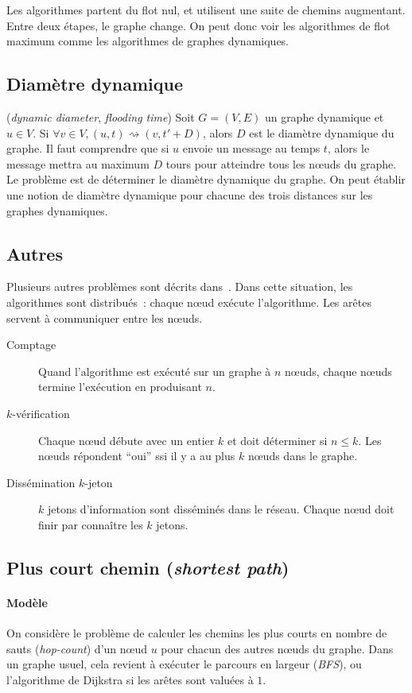 \documentclass[12pt,a4paper]{article}
\begin{document}
Les algorithmes partent du flot nul, et utilisent une suite de chemins
augmentant. Entre deux étapes, le graphe change. On peut donc voir les
algorithmes de flot maximum comme les algorithmes de graphes
dynamiques.

\subsection{Diamètre dynamique}
(\textit{dynamic diameter}, \textit{flooding time}) Soit
\(G = (V, E)\) un graphe dynamique et \(u \in V\). Si
\(\forall v \in V, (u, t) \rightsquigarrow (v, t' + D)\), alors \(D\)
est le diamètre dynamique du graphe. Il faut comprendre que si \(u\)
envoie un message au temps \(t\), alors le message mettra au maximum
\(D\) tours pour atteindre tous les nœuds du graphe. Le problème est
de déterminer le diamètre dynamique du graphe. On peut établir une
notion de diamètre dynamique pour chacune des trois distances sur les
graphes dynamiques.

\subsection{Autres}
Plusieurs autres problèmes sont décrits
dans~\cite{DBLP:conf/stoc/KuhnLO10}. Dans cette situation, les
algorithmes sont distribués~: chaque nœud exécute l'algorithme. Les
arêtes servent à communiquer entre les nœuds.
\begin{description}
\item[Comptage] Quand l'algorithme est exécuté sur un graphe à \(n\)
  nœuds, chaque nœuds termine l'exécution en produisant \(n\).
\item[\(k\)-vérification] Chaque nœud débute avec un entier \(k\) et
  doit déterminer si \(n \leq k\). Les nœuds répondent ``oui'' ssi il
  y a au plus \(k\) nœuds dans le graphe.
\item[Dissémination \(k\)-jeton] \(k\) jetons d'information sont
  disséminés dans le réseau. Chaque nœud doit finir par connaître les
  \(k\) jetons.
\end{description}

\subsection{Plus court chemin (\textit{shortest path})}

\paragraph{Modèle}
On considère le problème de calculer les chemins les plus courts en
nombre de sauts (\textit{hop-count}) d'un nœud \(u\) pour chacun des
autres nœuds du graphe. Dans un graphe usuel, cela revient à exécuter
le parcours en largeur (\textit{BFS}), ou l'algorithme de Dijkstra si
les arêtes sont valuées à \(1\).
\end{document}
